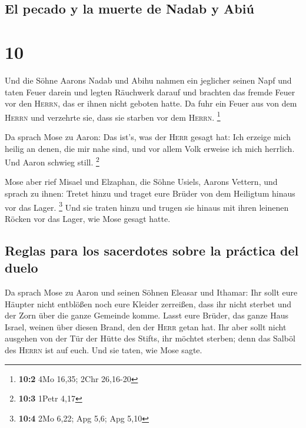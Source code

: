 \hypertarget{el-pecado-y-la-muerte-de-nadab-y-abiuxfa}{%
\subsection{El pecado y la muerte de Nadab y
Abiú}\label{el-pecado-y-la-muerte-de-nadab-y-abiuxfa}}

\hypertarget{section-9}{%
\section{10}\label{section-9}}

 Und die Söhne Aarons Nadab und Abihu nahmen ein jeglicher
seinen Napf und taten Feuer darein und legten Räuchwerk darauf und
brachten das fremde Feuer vor den \textsc{Herrn}, das er ihnen nicht
geboten hatte.  Da fuhr ein Feuer aus von dem
\textsc{Herrn} und verzehrte sie, dass sie starben vor dem
\textsc{Herrn}. \footnote{\textbf{10:2} 4Mo 16,35; 2Chr 26,16-20}

 Da sprach Mose zu Aaron: Das ist's, was der \textsc{Herr}
gesagt hat: Ich erzeige mich heilig an denen, die mir nahe sind, und vor
allem Volk erweise ich mich herrlich. Und Aaron schwieg still.
\footnote{\textbf{10:3} 1Petr 4,17}

 Mose aber rief Misael und Elzaphan, die Söhne Usiels,
Aarons Vettern, und sprach zu ihnen: Tretet hinzu und traget eure Brüder
von dem Heiligtum hinaus vor das Lager. \footnote{\textbf{10:4} 2Mo
  6,22; Apg 5,6; Apg 5,10}  Und sie traten hinzu und
trugen sie hinaus mit ihren leinenen Röcken vor das Lager, wie Mose
gesagt hatte.

\hypertarget{reglas-para-los-sacerdotes-sobre-la-pruxe1ctica-del-duelo}{%
\subsection{Reglas para los sacerdotes sobre la práctica del
duelo}\label{reglas-para-los-sacerdotes-sobre-la-pruxe1ctica-del-duelo}}

 Da sprach Mose zu Aaron und seinen Söhnen Eleasar und
Ithamar: Ihr sollt eure Häupter nicht entblößen noch eure Kleider
zerreißen, dass ihr nicht sterbet und der Zorn über die ganze Gemeinde
komme. Lasst eure Brüder, das ganze Haus Israel, weinen über diesen
Brand, den der \textsc{Herr} getan hat.  Ihr aber sollt
nicht ausgehen von der Tür der Hütte des Stifts, ihr möchtet sterben;
denn das Salböl des \textsc{Herrn} ist auf euch. Und sie taten, wie Mose
sagte.

